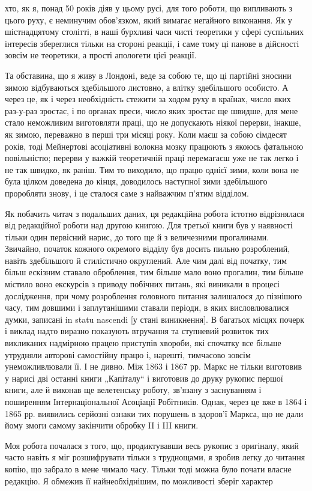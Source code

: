\parcont{}  %
хто, як я, понад 50 років діяв у цьому русі, для того роботи,
що випливають з цього руху, є неминучим обов’язком, який
вимагає негайного виконання. Як у шістнадцятому столітті, в
наші бурхливі часи чисті теоретики у сфері суспільних інтересів
збереглися тільки на стороні реакції, і саме тому ці панове
в дійсності зовсім не теоретики, а прості апологети цієї реакції.

Та обставина, що я живу в Лондоні, веде за собою те, що
ці партійні зносини зимою відбуваються здебільшого листовно,
а влітку здебільшого особисто. А через це, як і через необхідність
стежити за ходом руху в країнах, число яких раз-у-раз
зростає, і по органах преси, число яких зростає ще швидше, для
мене стало неможливим виготовляти праці, що не допускають
ніякої перерви, інакше, як зимою, переважно в перші три місяці
року. Коли маєш за собою сімдесят років, тоді Мейнертові асоціативні
волокна мозку працюють з якоюсь фатальною повільністю;
перерви у важкій теоретичній праці перемагаєш уже не так
легко і не так швидко, як раніш. Тим то виходило, що працю
однієї зими, коли вона не була цілком доведена до кінця, доводилось
наступної зими здебільшого проробляти знову, і це сталося
саме з найважчим п’ятим відділом.

Як побачить читач з подальших даних, ця редакційна робота
істотно відрізнялася від редакційної роботи над другою книгою.
Для третьої книги був у наявності тільки один первісний нарис,
до того ще й з величезними прогалинами. Звичайно, початок
кожного окремого відділу був досить пильно розроблений,
навіть здебільшого й стилістично округлений. Але чим далі від
початку, тим більш ескізним ставало оброблення, тим більше мало
воно прогалин, тим більше містило воно екскурсів з приводу побічних
питань, які виникали в процесі дослідження, при чому розроблення
головного питання залишалося до пізнішого часу, тим
довшими і заплутанішими ставали періоди, в яких висловлювалися
думки, записані in statu nascendi [у стані виникнення].
В багатьох місцях почерк і виклад надто виразно показують
втручання та ступневий розвиток тих викликаних надмірною
працею приступів хвороби, які спочатку все більше утрудняли
авторові самостійну працю і, нарешті, тимчасово зовсім унеможливлювали
її. І не дивно. Між 1863 і 1867 рр. Маркс не тільки
виготовив у нарисі дві останні книги „Капіталу“ і виготовив до
друку рукопис першої книги, але й виконав ще велетенську
роботу, зв’язану з заснуванням і поширенням Інтернаціональної
Асоціації Робітників. Однак, через це вже в 1864 і 1865 рр.
виявились серйозні ознаки тих порушень в здоров’ї Маркса, що
не дали йому змоги самому закінчити обробку II і III книги.

Моя робота почалася з того, що, продиктувавши весь рукопис
з оригіналу, який часто навіть я міг розшифрувати тільки з труднощами,
я зробив легку до читання копію, що забрало в мене
чимало часу. Тільки тоді можна було почати власне редакцію.
Я обмежив її найнеобхіднішим, по можливості зберіг характер
\parbreak{}  %
